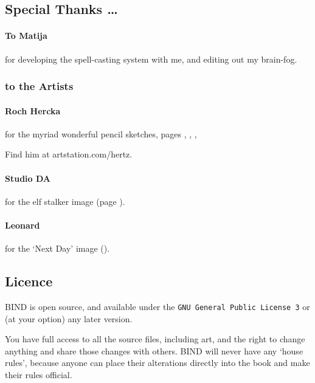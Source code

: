 \begin{multicols}{2}
\columnbreak

\subsection*{Special Thanks \ldots}

\paragraph{To Matija}
for developing the spell-casting system with me, and editing out my brain-fog.

\subsubsection*{to the Artists}

\paragraph{Roch Hercka} for the myriad wonderful pencil sketches, pages 
\pageref{Roch_Hercka/five_races}, 
\pageref{Roch_Hercka/xp-1}, 
\pageref{Roch_Hercka/xp-2}, 

Find him at artstation.com/hertz.

\paragraph{Studio DA}
for the elf stalker image
(page \pageref{Studio_DA/elf_stalker}).

\paragraph{Leonard}
for the `Next Day' image ().

\subsection*{Licence}

BIND is open source, and available under the {\tt GNU General Public License 3} or (at your option) any later version.

You have full access to all the source files, including art, and the right to change anything and share those changes with others.
BIND will never have any `house rules', because anyone can place their alterations directly into the book and make their rules official.

\end{multicols}
